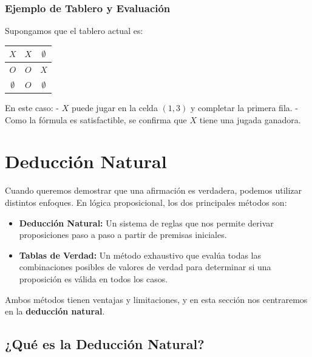 \subsubsection*{Ejemplo de Tablero y Evaluación}

Supongamos que el tablero actual es:

\begin{center}
\begin{tabular}{|c|c|c|}
    \hline
    \(X\) & \(X\) & \(\emptyset\) \\ \hline
    \(O\) & \(O\) & \(X\) \\ \hline
    \(\emptyset\) & \(O\) & \(\emptyset\) \\ \hline
\end{tabular}
\end{center}

En este caso:
- \(X\) puede jugar en la celda \( (1,3) \) y completar la primera fila.
- Como la fórmula es satisfactible, se confirma que \(X\) tiene una jugada ganadora.





\section{Deducción Natural}



\begin{tcolorbox}[colframe=blue!60, colback=blue!5, title=\textbf{Métodos de Demostración en Lógica Proposicional}]
Cuando queremos demostrar que una afirmación es verdadera, podemos utilizar distintos enfoques. En lógica proposicional, los dos principales métodos son:
\begin{itemize}
    \item \textbf{Deducción Natural:} Un sistema de reglas que nos permite derivar proposiciones paso a paso a partir de premisas iniciales.
    \item \textbf{Tablas de Verdad:} Un método exhaustivo que evalúa todas las combinaciones posibles de valores de verdad para determinar si una proposición es válida en todos los casos.
\end{itemize}
\end{tcolorbox}

Ambos métodos tienen ventajas y limitaciones, y en esta sección nos centraremos en la \textbf{deducción natural}.

\subsection{¿Qué es la Deducción Natural?}

